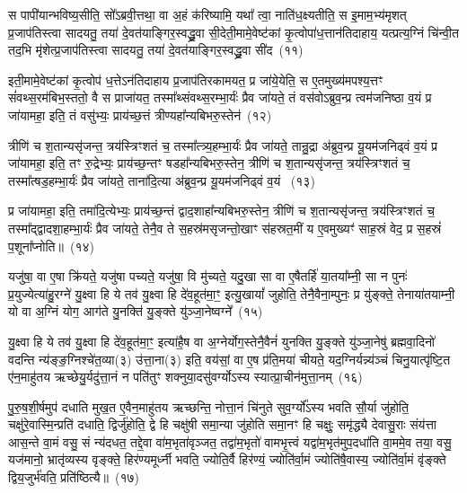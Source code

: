 स पापी॑यान्भविष्य॒सीति॒ सो᳚\-ऽब्रवी॒त्तथा॒ वा अ॒हं क॑रिष्यामि॒ यथा᳚ त्वा॒ नाति॑ध॒क्ष्यतीति॒ स इ॒माम॒भ्य॑मृशत् प्र॒जाप॑तिस्त्वा सादयतु॒ तया॑ दे॒वत॑याङ्गिर॒स्वद्ध्रु॒वा सी॒देती॒मामे॒वेष्ट॑कां कृ॒त्वोपा॑ध॒त्तान॑तिदाहाय॒ यत्प्रत्य॒ग्निं चि॑न्वी॒त तद॒भि मृ॑शेत्प्र॒जाप॑तिस्त्वा सादयतु॒ तया॑ दे॒वत॑याङ्गिर॒स्वद्ध्रु॒वा सी॑द~(११)

इती॒मामे॒वेष्ट॑कां कृ॒त्वोप॑ ध॒त्ते\-ऽन॑तिदाहाय प्र॒जाप॑तिरकामयत॒ प्र जा॑ये॒येति॒ स ए॒तमुख्य॑मपश्य॒त्तꣳ सं॑वथ्स॒रम॑बिभ॒स्ततो॒ वै स प्राजा॑यत॒ तस्मा᳚थ्संवथ्स॒रम्भा॒र्यः॑ प्रैव जा॑यते॒ तं वस॑वो\-ऽब्रुव॒न्प्र त्वम॑जनिष्ठा व॒यं प्र जा॑यामहा॒ इति॒ तं वसु॑भ्यः॒ प्राय॑च्छ॒त्तं त्रीण्यहा᳚न्यबिभरु॒स्तेन॑~(१२)

त्रीणि॑ च श॒तान्यसृ॑जन्त॒ त्रय॑स्त्रिꣳशतं च॒ तस्मा᳚त्त्र्य॒हम्भा॒र्यः॑ प्रैव जा॑यते॒ तान्रु॒द्रा अ॑ब्रुव॒न्प्र यू॒यम॑जनिढ्वं व॒यं प्र जा॑यामहा॒ इति॒ तꣳ रु॒द्रेभ्यः॒ प्राय॑च्छ॒न्तꣳ षडहा᳚न्यबिभरु॒स्तेन॒ त्रीणि॑ च श॒तान्यसृ॑जन्त॒ त्रय॑स्त्रिꣳशतं च॒ तस्मा᳚त्षड॒हम्भा॒र्यः॑ प्रैव जा॑यते॒ ताना॑दि॒त्या अ॑ब्रुव॒न्प्र यू॒यम॑जनिढ्वं व॒यं ~(१३)

प्र जा॑यामहा॒ इति॒ तमा॑दि॒त्येभ्यः॒ प्राय॑च्छ॒न्तं द्वाद॒शाहा᳚न्यबिभरु॒स्तेन॒ त्रीणि॑ च श॒तान्यसृ॑जन्त॒ त्रय॑स्त्रिꣳशतं च॒ तस्मा᳚द्द्वादशा॒हम्भा॒र्यः॑ प्रैव जा॑यते॒ तेनै॒व ते स॒हस्र॑मसृजन्तो॒खाꣳ स॑हस्रत॒मीं य ए॒वमुख्यꣳ॑ साह॒स्रं वेद॒ प्र स॒हस्रं॑ प॒शूना᳚प्नोति॥~(१४)

{\anuvakamend[{अ॒ग्नि॒वान्प॑शु॒मान॑सा॒नीति॒ वा अ॒ग्निर्ध॑विष्ये मृशेत्प्र॒जाप॑तिस्त्वा सादयतु॒ तया॑ दे॒वत॑याङ्गिर॒स्वद्ध्रु॒वा सी॑द॒ तेन॒ ताना॑दि॒त्या अ॑ब्रुव॒न्प्र यू॒यम॑जनिढ्वं व॒यञ्च॑त्वारि॒ꣳ॒शच्च॑}]}%

यजु॑षा॒ वा ए॒षा क्रि॑यते॒ यजु॑षा पच्यते॒ यजु॑षा॒ वि मु॑च्यते॒ यदु॒खा सा वा ए॒षैतर्\mbox{}हि॑ या॒तया᳚म्नी॒ सा न पुनः॑ प्र॒युज्येत्या॑हु॒रग्ने॑ यु॒क्ष्वा हि ये तव॑ यु॒क्ष्वा हि दे॑व॒हूत॑मा॒ꣳ॒ इत्यु॒खायां᳚ जुहोति॒ तेनै॒वैना॒म्पुनः॒ प्र यु॑ङ्क्ते॒ तेनाया॑तयाम्नी॒ यो वा अ॒ग्निं योग॒ आग॑ते यु॒नक्ति॑ यु॒ङ्क्ते यु॑ञ्जा॒नेष्वग्ने᳚~(१५)

यु॒क्ष्वा हि ये तव॑ यु॒क्ष्वा हि दे॑व॒हूत॑मा॒ꣳ॒ इत्या॑है॒ष वा अ॒ग्नेर्योग॒स्तेनै॒वैनं॑ युनक्ति यु॒ङ्क्ते यु॑ञ्जा॒नेषु॑ ब्रह्मवा॒दिनो॑ वदन्ति न्य॑ङ्ङ॒ग्निश्चे॑त॒व्या(३) उ॑त्ता॒ना(३) इति॒ वय॑सां॒ वा ए॒ष प्र॑ति॒मया॑ चीयते॒ यद॒ग्निर्यन्न्य॑ञ्चं चिनु॒यात्पृ॑ष्टि॒त ए॑न॒माहु॑तय ऋच्छेयु॒र्यदु॑त्ता॒नं न पति॑तुꣳ शक्नुया॒दसु॑वर्ग्यो\-ऽस्य स्यात्प्रा॒चीन॑मुत्ता॒नम्~(१६)

पु॒रु॒ष॒शी॒र्\mbox{}षमुप॑ दधाति मुख॒त ए॒वैन॒माहु॑तय ऋच्छन्ति॒ नोत्ता॒नं चि॑नुते सुव॒र्ग्यो᳚\-ऽस्य भवति सौ॒र्या जु॑होति॒ चक्षु॑रे॒वास्मि॒न्प्रति॑ दधाति॒ द्विर्जु॑होति॒ द्वे हि चक्षु॑षी समा॒न्या जु॑होति समा॒नꣳ हि चक्षुः॒ समृ॑द्ध्यै देवासु॒राः संय॑त्ता आस॒न्ते वा॒मं वसु॒ सं न्य॑दधत॒ तद्दे॒वा वा॑म॒भृता॑वृञ्जत॒ तद्वा॑म॒भृतो॑ वामभृ॒त्त्वं यद्वा॑म॒भृत॑मुप॒दधा॑ति वा॒ममे॒व तया॒ वसु॒ यज॑मानो॒ भ्रातृ॑व्यस्य वृङ्क्ते॒ हिर॑ण्यमूर्ध्नी भवति॒ ज्योति॒र्वै हिर॑ण्यं॒ ज्योति॑र्वा॒मं ज्योति॑षै॒वास्य॒ ज्योति॑र्वा॒मं वृ॑ङ्क्ते द्विय॒जुर्भ॑वति॒ प्रति॑ष्ठित्यै॥~(१७)

